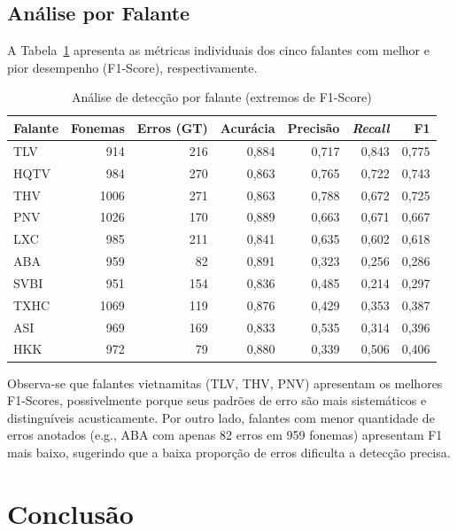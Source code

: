 \documentclass[12pt]{article}
\begin{document}
\subsection{Análise por Falante}

A Tabela~\ref{tab:falantes} apresenta as métricas individuais dos cinco falantes com melhor e pior desempenho (F1-Score), respectivamente.

\begin{table}[H]
\centering
\caption{Análise de detecção por falante (extremos de F1-Score)}
\label{tab:falantes}
\begin{tabular}{@{}lrrrrrr@{}}
\toprule
\textbf{Falante} & \textbf{Fonemas} & \textbf{Erros (GT)} & \textbf{Acurácia} & \textbf{Precisão} & \textbf{\textit{Recall}} & \textbf{F1} \\
\midrule
TLV   & 914  & 216 & 0,884 & 0,717 & 0,843 & 0,775 \\
HQTV  & 984  & 270 & 0,863 & 0,765 & 0,722 & 0,743 \\
THV   & 1006 & 271 & 0,863 & 0,788 & 0,672 & 0,725 \\
PNV   & 1026 & 170 & 0,889 & 0,663 & 0,671 & 0,667 \\
LXC   & 985  & 211 & 0,841 & 0,635 & 0,602 & 0,618 \\
\midrule
ABA   & 959  & 82  & 0,891 & 0,323 & 0,256 & 0,286 \\
SVBI  & 951  & 154 & 0,836 & 0,485 & 0,214 & 0,297 \\
TXHC  & 1069 & 119 & 0,876 & 0,429 & 0,353 & 0,387 \\
ASI   & 969  & 169 & 0,833 & 0,535 & 0,314 & 0,396 \\
HKK   & 972  & 79  & 0,880 & 0,339 & 0,506 & 0,406 \\
\bottomrule
\end{tabular}
\end{table}

Observa-se que falantes vietnamitas (TLV, THV, PNV) apresentam os melhores F1-Scores, possivelmente porque seus padrões de erro são mais sistemáticos e distinguíveis acusticamente. Por outro lado, falantes com menor quantidade de erros anotados (e.g., ABA com apenas 82 erros em 959 fonemas) apresentam F1 mais baixo, sugerindo que a baixa proporção de erros dificulta a detecção precisa.


\section{Conclusão} \label{sec:conclusao}
\end{document}
